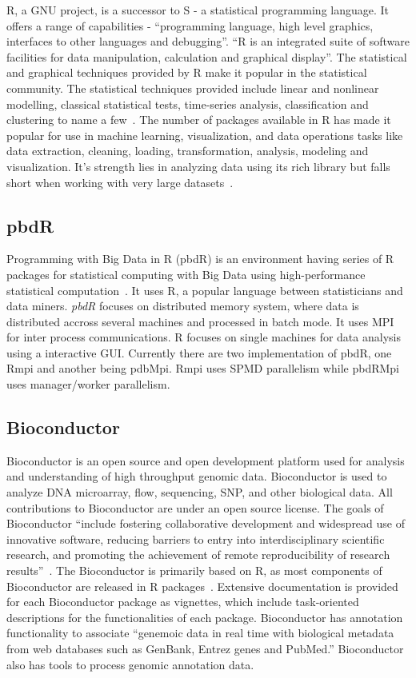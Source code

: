 R, a GNU project, is a successor to S - a statistical programming
language. It offers a range of capabilities - ``programming language,
high level graphics, interfaces to other languages and
debugging''. ``R is an integrated suite of software facilities for
data manipulation, calculation and graphical display''. The
statistical and graphical techniques provided by R make it popular in
the statistical community. The statistical techniques provided include
linear and nonlinear modelling, classical statistical tests,
time-series analysis, classification and clustering to name a
few~\cite{www-R}. The number of packages available in R has made it
popular for use in machine learning, visualization, and data
operations tasks like data extraction, cleaning, loading,
transformation, analysis, modeling and visualization. It's strength
lies in analyzing data using its rich library but falls short when
working with very large datasets~\cite{book-R}.
    
\subsection{pbdR}

Programming with Big Data in R (pbdR) is an environment having series
of R packages for statistical computing with Big Data using
high-performance statistical computation~\cite{www-pbdR}. It uses R, a
popular language between statisticians and data miners. \textit{pbdR} focuses
on distributed memory system, where data is distributed accross
several machines and processed in batch mode. It uses MPI for inter
process communications. R focuses on single machines for data analysis
using a interactive GUI. Currently there are two implementation of
pbdR, one Rmpi and another being pdbMpi.  Rmpi uses SPMD parallelism
while pbdRMpi uses manager/worker parallelism.

    \pv

\subsection{Bioconductor \cv}

Bioconductor is an open source and open development platform used for
analysis and understanding of high throughput genomic
data. Bioconductor is used to analyze DNA microarray, flow,
sequencing, SNP, and other biological data. All contributions to
Bioconductor are under an open source license. The goals of
Bioconductor ``include fostering collaborative development and
widespread use of innovative software, reducing barriers to entry into
interdisciplinary scientific research, and promoting the achievement
of remote reproducibility of research
results''~\cite{bioconductor-article-2004}.  The Bioconductor is
primarily based on R, as most components of Bioconductor are released
in R packages~\cite{www-bioconductor-about}.  Extensive documentation
is provided for each Bioconductor package as vignettes, which include
task-oriented descriptions for the functionalities of each
package. Bioconductor has annotation functionality to associate
``genemoic data in real time with biological metadata from web
databases such as GenBank, Entrez genes and PubMed.''  Bioconductor
also has tools to process genomic annotation data.

